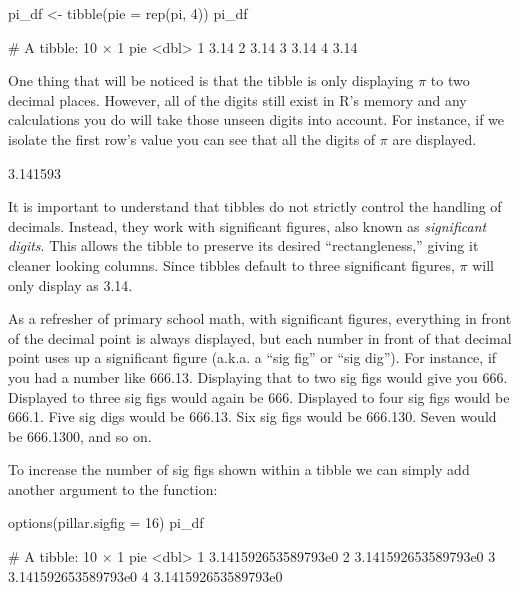 \begin{inR}
pi_df <- tibble(pie = rep(pi, 4))
pi_df
\end{inR}
\begin{outR}
# A tibble: 10 × 1
     pie
   <dbl>
 1  3.14
 2  3.14
 3  3.14
 4  3.14
\end{outR}

\noindent
One thing that will be noticed is that the tibble is only displaying $\pi$ to two decimal places. However, all of the digits still exist in R's memory and any calculations you do will take those unseen digits into account. For instance, if we isolate the first row's value you can see that all the digits of $\pi$ are displayed.

\begin{outR}
[1] 3.141593
\end{outR}

\noindent
It is important to understand that tibbles do not strictly control the handling of decimals. Instead, they work with \gls{significant figures}, also known as \textit{significant digits}.  This allows the tibble to preserve its desired ``rectangleness,'' giving it cleaner looking columns. Since tibbles default to three significant figures, $\pi$ will only display as 3.14. 

As a refresher of primary school math, with significant figures, everything in front of the decimal point is always displayed, but each number in front of that decimal point uses up a significant figure (a.k.a. a ``sig fig'' or ``sig dig''). For instance, if you had a number like 666.13.  Displaying that to two sig figs would give you 666.  Displayed to three sig figs would again be 666. Displayed to four sig figs would be 666.1. Five sig digs would be 666.13. Six sig figs would be 666.130. Seven would be 666.1300, and so on.

To increase the number of sig figs shown within a tibble we can simply add another argument to the  function:

\begin{inR}
options(pillar.sigfig = 16)
pi_df
\end{inR}
\begin{outR}
# A tibble: 10 × 1
                   pie
                 <dbl>
 1 3.141592653589793e0
 2 3.141592653589793e0
 3 3.141592653589793e0
 4 3.141592653589793e0
\end{outR}

